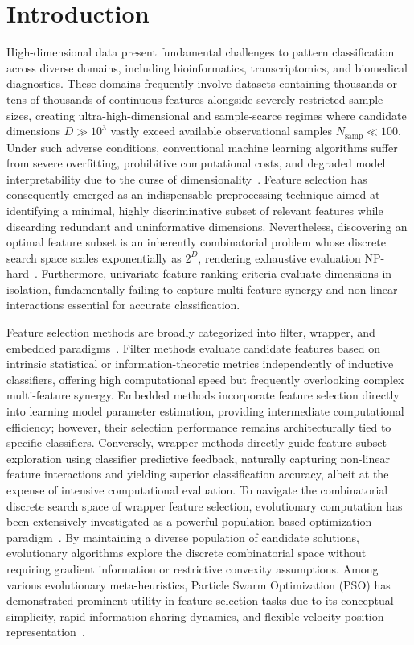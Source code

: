\section{Introduction}\label{sec:introduction}

High-dimensional data present fundamental challenges to pattern classification across diverse domains, including bioinformatics, transcriptomics, and biomedical diagnostics. These domains frequently involve datasets containing thousands or tens of thousands of continuous features alongside severely restricted sample sizes, creating ultra-high-dimensional and sample-scarce regimes where candidate dimensions $D \gg 10^3$ vastly exceed available observational samples $N_{\mathrm{samp}} \ll 100$. Under such adverse conditions, conventional machine learning algorithms suffer from severe overfitting, prohibitive computational costs, and degraded model interpretability due to the curse of dimensionality~\cite{lili2017,guyon2003}. Feature selection has consequently emerged as an indispensable preprocessing technique aimed at identifying a minimal, highly discriminative subset of relevant features while discarding redundant and uninformative dimensions. Nevertheless, discovering an optimal feature subset is an inherently combinatorial problem whose discrete search space scales exponentially as $2^D$, rendering exhaustive evaluation NP-hard~\cite{liang2025}. Furthermore, univariate feature ranking criteria evaluate dimensions in isolation, fundamentally failing to capture multi-feature synergy and non-linear interactions essential for accurate classification.

Feature selection methods are broadly categorized into filter, wrapper, and embedded paradigms~\cite{kohavi1997,lili2017}. Filter methods evaluate candidate features based on intrinsic statistical or information-theoretic metrics independently of inductive classifiers, offering high computational speed but frequently overlooking complex multi-feature synergy. Embedded methods incorporate feature selection directly into learning model parameter estimation, providing intermediate computational efficiency; however, their selection performance remains architecturally tied to specific classifiers. Conversely, wrapper methods directly guide feature subset exploration using classifier predictive feedback, naturally capturing non-linear feature interactions and yielding superior classification accuracy, albeit at the expense of intensive computational evaluation. To navigate the combinatorial discrete search space of wrapper feature selection, evolutionary computation has been extensively investigated as a powerful population-based optimization paradigm~\cite{xue2016survey,liang2025}. By maintaining a diverse population of candidate solutions, evolutionary algorithms explore the discrete combinatorial space without requiring gradient information or restrictive convexity assumptions. Among various evolutionary meta-heuristics, Particle Swarm Optimization (PSO) has demonstrated prominent utility in feature selection tasks due to its conceptual simplicity, rapid information-sharing dynamics, and flexible velocity-position representation~\cite{kennedy1995,shi1998,kennedy1997}.

